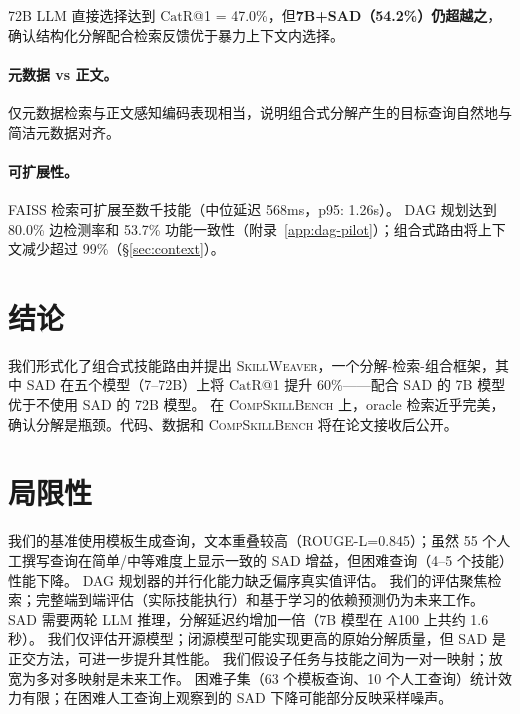 \documentclass[11pt,a4paper]{ctexart}
\newcommand{\system}{\textsc{SkillWeaver}}
\newcommand{\benchmark}{\textsc{CompSkillBench}}
\newcommand{\catrecall}{\text{CatR}}
\begin{document}
72B LLM 直接选择达到 $\catrecall$@1 = 47.0\%，但\textbf{7B+SAD（54.2\%）仍超越之}，确认结构化分解配合检索反馈优于暴力上下文内选择。

\paragraph{元数据 vs 正文。}
仅元数据检索与正文感知编码表现相当，说明组合式分解产生的目标查询自然地与简洁元数据对齐。

\paragraph{可扩展性。}
FAISS 检索可扩展至数千技能（中位延迟 568ms，p95: 1.26s）。
DAG 规划达到 80.0\% 边检测率和 53.7\% 功能一致性（附录~\ref{app:dag-pilot}）；组合式路由将上下文减少超过 99\%（\S\ref{sec:context}）。

\section{结论}
\label{sec:conclusion}

我们形式化了组合式技能路由并提出 \system{}，一个分解-检索-组合框架，其中 SAD 在五个模型（7--72B）上将 $\catrecall$@1 提升 60\%——配合 SAD 的 7B 模型优于不使用 SAD 的 72B 模型。
在 \benchmark{} 上，oracle 检索近乎完美，确认分解是瓶颈。代码、数据和 \benchmark{} 将在论文接收后公开。



\section*{局限性}

我们的基准使用模板生成查询，文本重叠较高（ROUGE-L=0.845）；虽然 55 个人工撰写查询在简单/中等难度上显示一致的 SAD 增益，但困难查询（4--5 个技能）性能下降。
DAG 规划器的并行化能力缺乏偏序真实值评估。
我们的评估聚焦检索；完整端到端评估（实际技能执行）和基于学习的依赖预测仍为未来工作。
SAD 需要两轮 LLM 推理，分解延迟约增加一倍（7B 模型在 A100 上共约 1.6 秒）。
我们仅评估开源模型；闭源模型可能实现更高的原始分解质量，但 SAD 是正交方法，可进一步提升其性能。
我们假设子任务与技能之间为一对一映射；放宽为多对多映射是未来工作。
困难子集（63 个模板查询、10 个人工查询）统计效力有限；在困难人工查询上观察到的 SAD 下降可能部分反映采样噪声。
\end{document}
